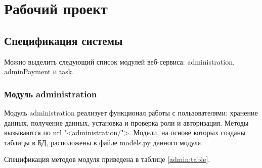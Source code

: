 \section{Рабочий проект}
\subsection{Спецификация системы}

Можно выделить следующий список модулей веб-сервиса: administration, adminPayment и task.

\subsubsection{Модуль administration}

Модуль administration реализует функционал работы с пользователями: хранение данных, получение данных, установка и проверка роли и авторизация. Методы вызываются по url "<administration/">. Модели, на основе которых созданы таблицы в БД, расположены в файле models.py данного модуля.

Спецификация методов модуля приведена в таблице \ref{admin:table}.


